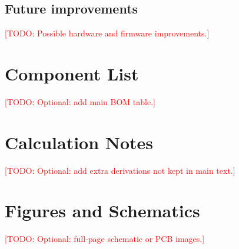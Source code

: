 \documentclass[11pt,a4paper]{article}
\newcommand{\todo}[1]{\textcolor{red}{[TODO: #1]}}
\begin{document}
\subsection{Future improvements}
\todo{Possible hardware and firmware improvements.}

\appendix

\section{Component List}
\label{app:bom}
\todo{Optional: add main BOM table.}

\section{Calculation Notes}
\label{app:calc}
\todo{Optional: add extra derivations not kept in main text.}

\section{Figures and Schematics}
\label{app:figures}
\todo{Optional: full-page schematic or PCB images.}


% 
\end{document}
